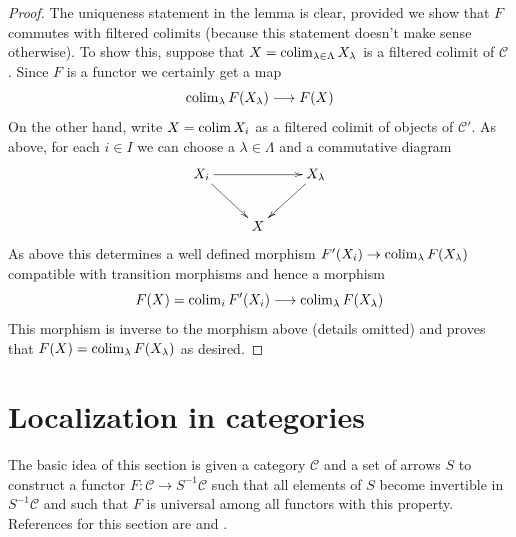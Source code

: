 \begin{proof}
\medskip\noindent
The uniqueness statement in the lemma is clear, provided
we show that $F$ commutes with filtered colimits (because this
statement doesn't make sense otherwise). To show this, suppose that
$X = \mathop{\mathrm{colim}}\nolimits_{\lambda \in \Lambda} X_\lambda$
is a filtered colimit of $\mathcal{C}$. Since $F$ is a functor
we certainly get a map
$$
\mathop{\mathrm{colim}}\nolimits_\lambda F(X_\lambda) \longrightarrow F(X)
$$
On the other hand, write $X = \mathop{\mathrm{colim}}\nolimits X_i$
as a filtered colimit of objects of $\mathcal{C}'$.
As above, for each $i \in I$ we can choose a $\lambda \in \Lambda$
and a commutative diagram
$$
\xymatrix{
X_i \ar[rr] \ar[rd] & & X_\lambda \ar[ld] \\
& X
}
$$
As above this determines a well defined morphism
$F'(X_i) \to \mathop{\mathrm{colim}}\nolimits_\lambda F(X_\lambda)$ compatible
with transition morphisms and hence a morphism
$$
F(X) = \mathop{\mathrm{colim}}\nolimits_i F'(X_i) \longrightarrow \mathop{\mathrm{colim}}\nolimits_\lambda F(X_\lambda)
$$
This morphism is inverse to the morphism above (details omitted)
and proves that $F(X) = \mathop{\mathrm{colim}}\nolimits_\lambda F(X_\lambda)$ as desired.
\end{proof}







\section{Localization in categories}
\label{section-localization}

\noindent
The basic idea of this section is given a category $\mathcal{C}$
and a set of arrows $S$ to construct a functor
$F : \mathcal{C} \to S^{-1}\mathcal{C}$
such that all elements of $S$ become invertible in $S^{-1}\mathcal{C}$
and such that $F$ is universal among all functors with this property.
References for this section are \cite[Chapter I, Section 2]{GZ}
and \cite[Chapter II, Section 2]{Verdier}.

